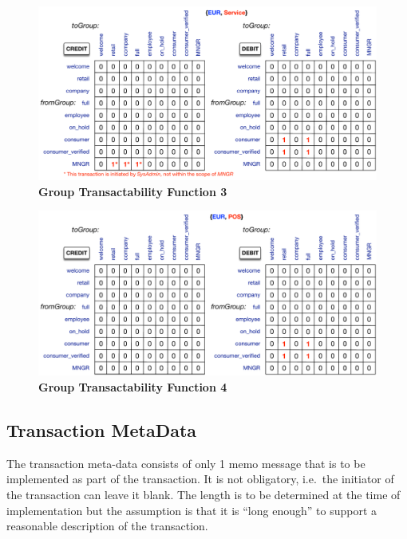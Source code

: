 \begin{figure}[H]
\vspace{-0.5cm}
\centering
\includegraphics[width=16cm]{Figures/GTF3}
\caption{\small\textbf{Group Transactability Function 3}}
\label{fig:GTF3}
\end{figure}

\begin{figure}[H]
\vspace{-0.5cm}
\centering
\includegraphics[width=16cm]{Figures/GTF4}
\caption{\small\textbf{Group Transactability Function 4}}
\label{fig:GTF4}
\end{figure}


\subsection{Transaction MetaData}

The transaction meta-data consists of only 1 memo message that is to be implemented as part of the transaction. It is not obligatory, i.e.\ the initiator of the transaction can leave it blank. The length is to be determined at the time of implementation but the assumption is that it is ``long enough'' to support a reasonable description of the transaction.

